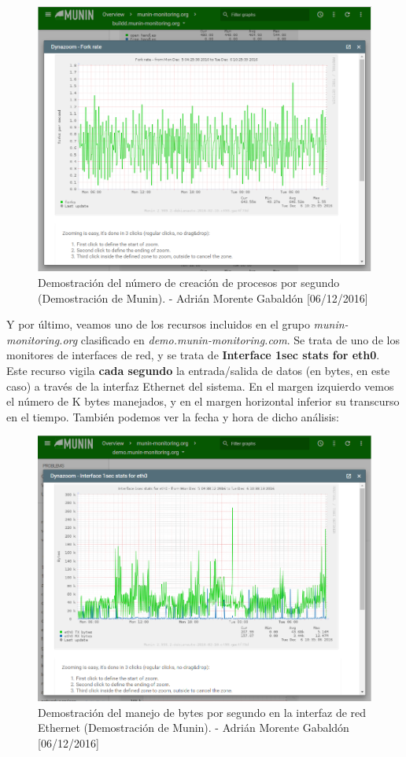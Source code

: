 \begin{figure}[H]
	\centering
	\includegraphics[scale=0.3]{munin-forkrate}
	\caption{Demostración del número de creación de procesos por segundo (Demostración de Munin). - Adrián Morente Gabaldón [06/12/2016]}
	\label{figura5}
\end{figure}
Y por último, veamos uno de los recursos incluidos en el grupo \emph{munin-monitoring.org} clasificado en \emph{demo.munin-monitoring.com}. Se trata de uno de los monitores de interfaces de red, y se trata de \textbf{Interface 1sec stats for eth0}. Este recurso vigila \textbf{cada segundo} la entrada/salida de datos (en bytes, en este caso) a través de la interfaz Ethernet del sistema. En el margen izquierdo vemos el número de K bytes manejados, y en el margen horizontal inferior su transcurso en el tiempo. También podemos ver la fecha y hora de dicho análisis:
\begin{figure}[H]
	\centering
	\includegraphics[scale=0.3]{munin-network}
	\caption{Demostración del manejo de bytes por segundo en la interfaz de red Ethernet (Demostración de Munin). - Adrián Morente Gabaldón [06/12/2016]}
	\label{figura6}
\end{figure}

